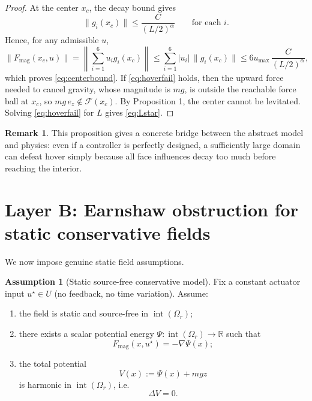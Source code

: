 \documentclass[11pt]{article}
\theoremstyle{definition}
\newtheorem{remark}{Remark}
\newtheorem{assumption}{Assumption}
\begin{document}
\begin{proof}
At the center $x_c$, the decay bound gives
\[
\|g_i(x_c)\|\le \frac{C}{(L/2)^\alpha}
\qquad \text{for each } i.
\]
Hence, for any admissible $u$,
\[
\|F_{\mathrm{mag}}(x_c,u)\|
=
\left\|\sum_{i=1}^6 u_i g_i(x_c)\right\|
\le
\sum_{i=1}^6 |u_i|\,\|g_i(x_c)\|
\le
6u_{\max}\,\frac{C}{(L/2)^\alpha},
\]
which proves \eqref{eq:centerbound}. If \eqref{eq:hoverfail} holds, then the upward force needed to cancel gravity, whose magnitude is $mg$, is outside the reachable force ball at $x_c$, so $mg\,e_z\notin\mathcal{F}(x_c)$. By Proposition 1, the center cannot be levitated. Solving \eqref{eq:hoverfail} for $L$ gives \eqref{eq:Lstar}.
\end{proof}

\begin{remark}
This proposition gives a concrete bridge between the abstract model and physics: even if a controller is perfectly designed, a sufficiently large domain can defeat hover simply because all face influences decay too much before reaching the interior.
\end{remark}

\section{Layer B: Earnshaw obstruction for static conservative fields}

We now impose genuine static field assumptions.

\begin{assumption}[Static source-free conservative model]
Fix a constant actuator input $u^\star\in U$ (no feedback, no time variation). Assume:
\begin{enumerate}[label=(\roman*), leftmargin=1.5em]
    \item the field is static and source-free in $\operatorname{int}(\Omega_r)$;
    \item there exists a scalar potential energy $\Psi:\operatorname{int}(\Omega_r)\to\mathbb{R}$ such that
    \begin{equation}
    F_{\mathrm{mag}}(x,u^\star) = -\nabla \Psi(x);
    \label{eq:consforce}
    \end{equation}
    \item the total potential
    \begin{equation}
    V(x):=\Psi(x)+mgz
    \label{eq:totalpotential}
    \end{equation}
    is harmonic in $\operatorname{int}(\Omega_r)$, i.e.
    \begin{equation}
    \Delta V = 0.
    \label{eq:harmonicV}
    \end{equation}
\end{enumerate}
\end{assumption}
\end{document}
